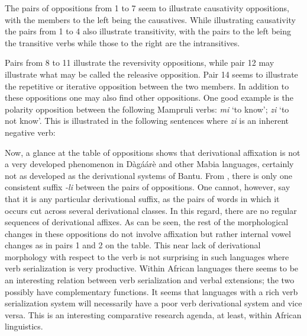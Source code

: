 \begin{refsection}
The pairs of oppositions from 1 to 7 seem to illustrate causativity oppositions, with the
members to the left being the causatives.
While illustrating causativity the pairs from 1 to 4 also illustrate transitivity, with the
pairs to the left being the transitive verbs while those to the right are the intransitives.

Pairs from 8 to 11 illustrate the reversivity oppositions, while pair 12 may
illustrate what may be called the releasive opposition. Pair 14 seems to illustrate the repetitive
or iterative opposition between the two members.
In addition to these oppositions one may also find other oppositions. One good
example is the polarity opposition between the following Mampruli verbs: \textit{mi} ‘to know’; \textit{zi}
‘to not know’. This is illustrated in the following sentences where \textit{zi} is an inherent negative
verb:

\ea {}
\z\z



Now, a glance at the table of oppositions shows that derivational affixation is not a
very developed phenomenon in Dàgáárè and other Mabia languages, certainly not as
developed as the derivational systems of Bantu. From , there is only one
consistent suffix \textit{-li} between the pairs of oppositions. One cannot, however, say that it is any
particular derivational suffix, as the pairs of words in which it occurs cut across several
derivational classes. In this regard, there are no regular sequences of derivational affixes. As
can be seen, the rest of the morphological changes in these oppositions do not involve
affixation but rather internal vowel changes as in pairs 1 and 2 on the table.
This near lack of derivational morphology with respect to the verb is not surprising in
such languages where verb serialization is very productive. Within African languages there seems to be an interesting relation between verb serialization and verbal extensions; the
two possibly have complementary functions. It seems that languages with a rich verb
serialization system will necessarily have a poor verb derivational system and vice versa. This
is an interesting comparative research agenda, at least, within African linguistics.


\end{refsection}
